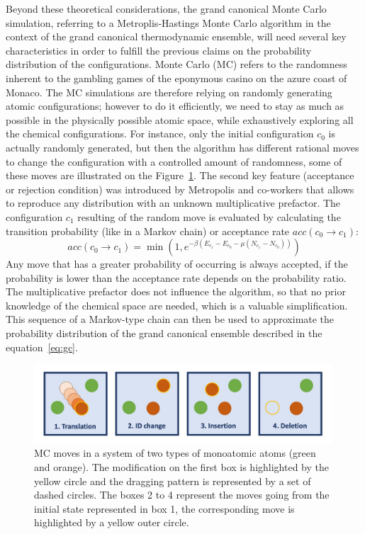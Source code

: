 \documentclass[main.tex]{subfiles}
\begin{document}
Beyond these theoretical considerations, the grand canonical Monte Carlo simulation, referring to a Metroplis-Hastings Monte Carlo algorithm in the context of the grand canonical thermodynamic ensemble, will need several key characteristics in order to fulfill the previous claims on the probability distribution of the configurations. Monte Carlo (MC) refers to the randomness inherent to the gambling games of the eponymous casino on the azure coast of Monaco. The MC simulations are therefore relying on randomly generating atomic configurations; however  to do it efficiently, we need to stay as much as possible in the physically possible atomic space, while exhaustively exploring all the chemical configurations. 
For instance, only the initial configuration $c_0$ is actually randomly generated, but then the algorithm has different rational moves to change the configuration with a controlled amount of randomness, some of these moves are illustrated on the Figure~\ref{fgr:mc}. The second key feature (acceptance or rejection condition) was introduced by Metropolis and co-workers that allows to reproduce any distribution with an unknown multiplicative prefactor.\autocite{Metropolis1949} The configuration $c_1$ resulting of the random move is evaluated by calculating the transition probability (like in a Markov chain) or acceptance rate $acc(c_0 \rightarrow c_1)$: 
\begin{equation}
  acc(c_0 \rightarrow c_1) = \min\left(1, e^{-\beta\left(E_{c_1}-E_{c_0}-\mu \left(N_{c_1}-N_{c_0}\right)\right) }\right)
\end{equation}
Any move that has a greater probability of occurring is always accepted, if the probability is lower than the acceptance rate depends on the probability ratio.
The multiplicative prefactor does not influence the algorithm, so that no prior knowledge of the chemical space are needed, which is a valuable simplification. This sequence of a Markov-type chain can then be used to approximate the probability distribution of the grand canonical ensemble described in the equation~\ref{eq:gc}.

\begin{figure}[ht]
  \centering
  \includegraphics[width=0.99\textwidth]{figures/2-thermo/MC_moves.jpg}
  \caption{MC moves in a system of two types of monoatomic atoms (green and orange). The modification on the first box is highlighted by the yellow circle and the dragging pattern is represented by a set of dashed circles. The boxes 2 to 4 represent the moves going from the initial state represented in box 1, the corresponding move is highlighted by a yellow outer circle. }\label{fgr:mc}
\end{figure}
\end{document}
